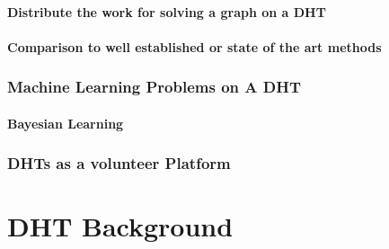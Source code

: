\documentclass[10pt,letterpaper]{report}
\begin{document}
\subsubsection{Distribute the work for solving a graph on a DHT}
\subsubsection{Comparison to well established or state of the art methods}

\subsection{Machine Learning Problems on A DHT}
\subsubsection{Bayesian Learning}

\subsection{DHTs as a volunteer Platform}

\chapter{DHT Background}





\end{document}
